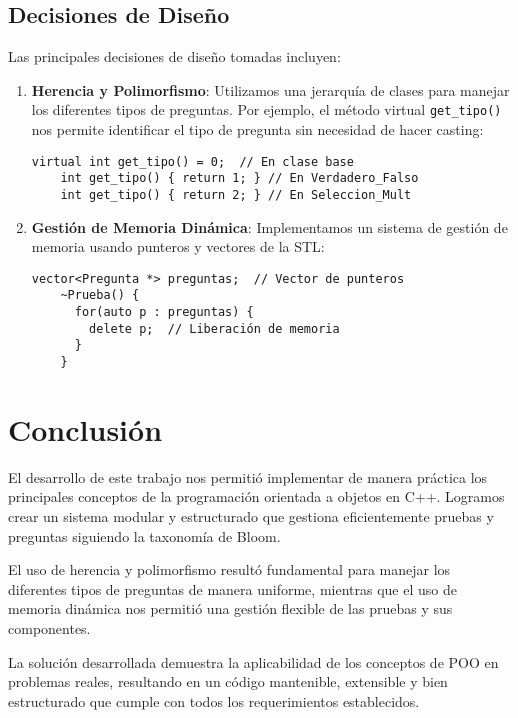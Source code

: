 \documentclass[12pt]{article}
\begin{document}
\subsection{Decisiones de Dise\~no}
Las principales decisiones de dise\~no tomadas incluyen:

\begin{enumerate}
    \item \textbf{Herencia y Polimorfismo}: Utilizamos una jerarqu\'ia de clases para manejar los diferentes tipos de preguntas. Por ejemplo, el m\'etodo virtual \texttt{get\_tipo()} nos permite identificar el tipo de pregunta sin necesidad de hacer casting:
    \begin{lstlisting}[style=customc]
    virtual int get_tipo() = 0;  // En clase base
    int get_tipo() { return 1; } // En Verdadero_Falso
    int get_tipo() { return 2; } // En Seleccion_Mult
    \end{lstlisting}

    \item \textbf{Gesti\'on de Memoria Din\'amica}: Implementamos un sistema de gesti\'on de memoria usando punteros y vectores de la STL:
    \begin{lstlisting}[style=customc]
    vector<Pregunta *> preguntas;  // Vector de punteros
    ~Prueba() {
      for(auto p : preguntas) {
        delete p;  // Liberación de memoria
      }
    }
    \end{lstlisting}
\end{enumerate}

\section{Conclusi\'on}
El desarrollo de este trabajo nos permiti\'o implementar de manera pr\'actica los principales conceptos de la programaci\'on orientada a objetos en C++. Logramos crear un sistema modular y estructurado que gestiona eficientemente pruebas y preguntas siguiendo la taxonom\'ia de Bloom.

El uso de herencia y polimorfismo result\'o fundamental para manejar los diferentes tipos de preguntas de manera uniforme, mientras que el uso de memoria din\'amica nos permiti\'o una gesti\'on flexible de las pruebas y sus componentes.

La soluci\'on desarrollada demuestra la aplicabilidad de los conceptos de POO en problemas reales, resultando en un c\'odigo mantenible, extensible y bien estructurado que cumple con todos los requerimientos establecidos.
\end{document}
